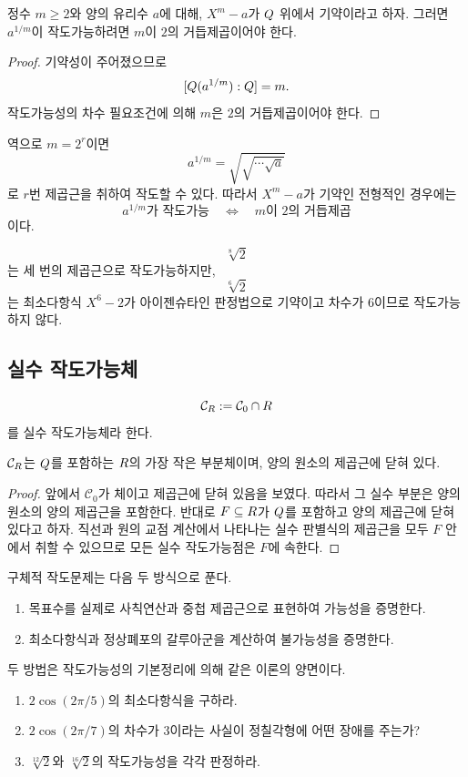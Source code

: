 \begin{proposition}
정수 $m\ge2$와 양의 유리수 $a$에 대해, $X^m-a$가 $Q$ 위에서 기약이라고 하자. 그러면 $a^{1/m}$이 작도가능하려면 $m$이 $2$의 거듭제곱이어야 한다.
\end{proposition}

\begin{proof}
기약성이 주어졌으므로
\[
  [Q(a^{1/m}):Q]=m.
\]
작도가능성의 차수 필요조건에 의해 $m$은 $2$의 거듭제곱이어야 한다.
\end{proof}

역으로 $m=2^r$이면
\[
  a^{1/m}
  =\sqrt{\sqrt{\cdots\sqrt a}}
\]
로 $r$번 제곱근을 취하여 작도할 수 있다. 따라서 $X^m-a$가 기약인 전형적인 경우에는
\[
  a^{1/m}\text{가 작도가능}
  \quad\Longleftrightarrow\quad
  m\text{이 }2\text{의 거듭제곱}
\]
이다.

\begin{example}
\[
  \sqrt[8]2
\]
는 세 번의 제곱근으로 작도가능하지만,
\[
  \sqrt[6]2
\]
는 최소다항식 $X^6-2$가 아이젠슈타인 판정법으로 기약이고 차수가 $6$이므로 작도가능하지 않다.
\end{example}

\subsection{실수 작도가능체}

\begin{definition}
\[
  \mathcal C_{R}:=\mathcal C_0\cap R
\]
를 실수 작도가능체라 한다.
\end{definition}

\begin{proposition}
$\mathcal C_{R}$는 $Q$를 포함하는 $R$의 가장 작은 부분체이며, 양의 원소의 제곱근에 닫혀 있다.
\end{proposition}

\begin{proof}
앞에서 $\mathcal C_0$가 체이고 제곱근에 닫혀 있음을 보였다. 따라서 그 실수 부분은 양의 원소의 양의 제곱근을 포함한다. 반대로 $F\subseteq R$가 $Q$를 포함하고 양의 제곱근에 닫혀 있다고 하자. 직선과 원의 교점 계산에서 나타나는 실수 판별식의 제곱근을 모두 $F$ 안에서 취할 수 있으므로 모든 실수 작도가능점은 $F$에 속한다.
\end{proof}

\begin{keyidea}
구체적 작도문제는 다음 두 방식으로 푼다.
\begin{enumerate}
  \item 목표수를 실제로 사칙연산과 중첩 제곱근으로 표현하여 가능성을 증명한다.
  \item 최소다항식과 정상폐포의 갈루아군을 계산하여 불가능성을 증명한다.
\end{enumerate}
두 방법은 작도가능성의 기본정리에 의해 같은 이론의 양면이다.
\end{keyidea}

\begin{checkpoint}
\begin{enumerate}[label=(\alph*)]
  \item $2\cos(2\pi/5)$의 최소다항식을 구하라.
  \item $2\cos(2\pi/7)$의 차수가 $3$이라는 사실이 정칠각형에 어떤 장애를 주는가?
  \item $\sqrt[12]2$와 $\sqrt[16]2$의 작도가능성을 각각 판정하라.
\end{enumerate}
\end{checkpoint}
